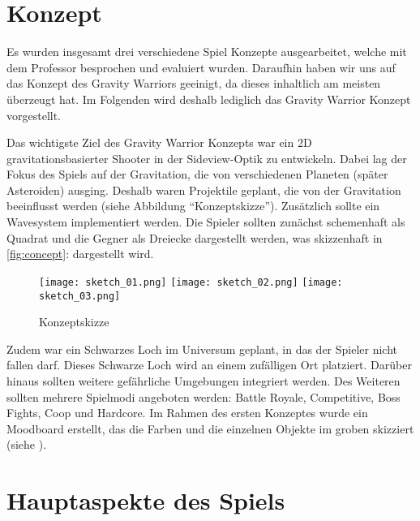 \documentclass[11pt]{scrartcl}
\begin{document}
\newpage
\section{Konzept}
Es wurden insgesamt drei verschiedene Spiel Konzepte ausgearbeitet, welche mit dem Professor besprochen und evaluiert wurden. Daraufhin haben wir uns auf das Konzept des Gravity Warriors geeinigt, da dieses inhaltlich am meisten überzeugt hat. Im Folgenden wird deshalb lediglich das Gravity Warrior Konzept vorgestellt. 

Das wichtigste Ziel des Gravity Warrior Konzepts war ein 2D gravitationsbasierter Shooter in der Sideview-Optik zu entwickeln. Dabei lag der Fokus des Spiels auf der Gravitation, die von verschiedenen Planeten (später Asteroiden) ausging. Deshalb waren Projektile geplant, die von der Gravitation beeinflusst werden (siehe Abbildung “Konzeptskizze”). Zusätzlich sollte ein Wavesystem implementiert werden. Die Spieler sollten zunächst schemenhaft als Quadrat und die Gegner als Dreiecke dargestellt werden, was skizzenhaft in \autoref{fig:concept}:  dargestellt wird.

\begin{figure}[htp]
	\centering
	\texttt{[image: sketch\_01.png]}\hfill
	\texttt{[image: sketch\_02.png]}\hfill
	\texttt{[image: sketch\_03.png]}
	\caption{Konzeptskizze}
	\label{fig:concept}
\end{figure}

Zudem war ein Schwarzes Loch im Universum geplant, in das der Spieler nicht fallen darf. Dieses Schwarze Loch wird an einem zufälligen Ort platziert. Darüber hinaus sollten weitere gefährliche Umgebungen integriert werden. Des Weiteren sollten mehrere Spielmodi angeboten werden: Battle Royale, Competitive, Boss Fights, Coop und Hardcore. Im Rahmen des ersten Konzeptes wurde ein Moodboard erstellt, das die Farben und die einzelnen Objekte im groben skizziert (siehe ).

\newpage
\section{Hauptaspekte des Spiels}
\end{document}
